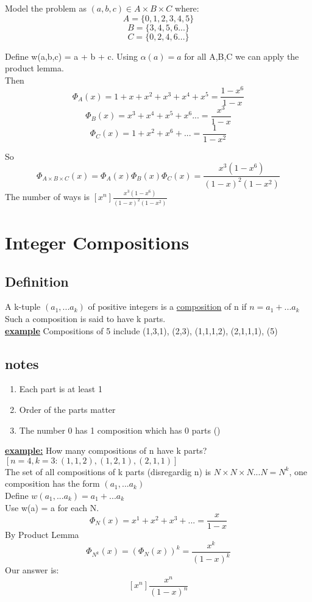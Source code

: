 \documentclass[12pt]{article}
\newcommand{\myt}[1]{\textbf{\underline{#1}}}
\begin{document}
	Model the problem as $(a,b,c) \in A \times B \times C$ where:\\
	$$A = \{0,1,2,3,4,5\}$$
	$$B = \{3,4,5,6 ...\}$$
	$$C = \{0,2,4,6 ...\}$$
	
	Define w(a,b,c) = a + b + c. Using $\alpha(a) = a$ for all A,B,C we can apply the product lemma.\\
	Then 
	$$\Phi_A(x) = 1 + x + x^2 + x^3 + x^4 + x^5 = \frac{1-x^6}{1-x}$$
	$$\Phi_B(x) = x^3 + x^4 + x^5 + x^6 ... = \frac{x^3}{1-x}$$
	$$\Phi_C(x) = 1 + x^2 + x^6 + ... = \frac{1}{1-x^2}$$
	
	So
	$$\Phi_{A\times B \times C}(x) = \Phi_A(x) \Phi_B(x) \Phi_C(x) = \frac{x^3(1-x^6)}{(1-x)^2(1-x^2)}$$
	The number of ways is $[x^n]\frac{x^3(1-x^6)}{(1-x)^2(1-x^2)}$\\
	
	\section*{Integer Compositions}
	\subsection{Definition}
	A k-tuple $(a_1, ... a_k)$ of positive integers is a \underline{composition} of n if $n=a_1 + ... a_k$ Such a composition is said to have k parts.\\
	
	\myt{example} Compositions of 5 include (1,3,1), (2,3), (1,1,1,2), (2,1,1,1), (5)\\
	
	\subsection*{notes}
	\begin{enumerate}
		\item Each part is at least 1
		\item Order of the parts matter
		\item The number 0 has 1 composition which has 0 parts ()
	\end{enumerate}
	
	\myt{example:} How many compositions of n have k parts?\\
	$[n=4, k=3 : (1,1,2), (1,2,1), (2,1,1)]$\\
	
	The set of all compositions of k parts (disregardig n) is $N \times N \times N ... N = N^k$, one composition has the form $(a_1,...a_k)$\\
	
	Define $w(a_1, ... a_k) = a_1 + ... a_k$\\
	Use w(a) = a for each N. \\
	$$\Phi_N(x) = x^1 + x^2 + x^3 + ... = \frac{x}{1-x}$$
	By Product Lemma
	$$\Phi_{N^k}(x) = (\Phi_N(x))^k = \frac{x^k}{(1-x)^k}$$
	Our answer is:
	$$[x^n]\frac{x^n}{(1-x)^n}$$
	
	
	
	
\end{document}
